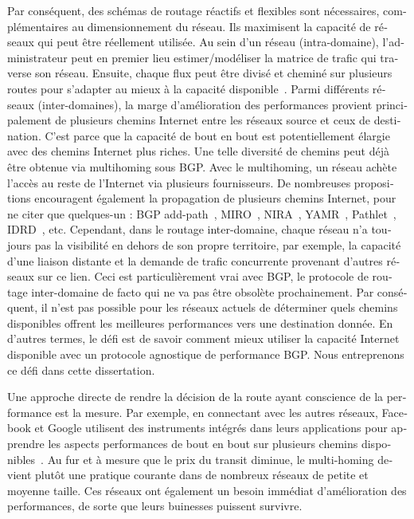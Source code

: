 \begin{otherlanguage}{french}
Par conséquent, des schémas de routage réactifs et flexibles sont nécessaires, complémentaires au dimensionnement du réseau.
Ils maximisent la capacité de réseaux qui peut être réellement utilisée.
Au sein d'un réseau (intra-domaine), l'administrateur peut en premier lieu estimer/modéliser la matrice de trafic qui traverse son réseau. 
Ensuite, chaque flux peut être divisé et cheminé sur plusieurs routes pour s'adapter au mieux à la capacité disponible~\cite{Xu2011, Jain2013}.
Parmi différents réseaux (inter-domaines), la marge d'amélioration des performances provient principalement de plusieurs chemins Internet 
entre les réseaux source et ceux de destination.
C'est parce que la capacité de bout en bout est potentiellement élargie avec des chemins Internet plus riches.
Une telle diversité de chemins peut déjà être obtenue via multihoming sous \acf{BGP}. 
Avec le multihoming, un réseau achète l'accès au reste de l'Internet via plusieurs fournisseurs.
De nombreuses propositions encouragent également la propagation de plusieurs chemins Internet, 
pour ne citer que quelques-un : BGP add-path~\cite{addpath}, MIRO~\cite{Xu2006}, NIRA~\cite{Yang2007}, YAMR~\cite{Ganichev2010}, Pathlet~\cite{Godfrey09}, IDRD~\cite{Misseri2013}, etc.
Cependant, dans le routage inter-domaine, chaque réseau n'a toujours pas la visibilité en dehors de son propre territoire, 
par exemple, la capacité d'une liaison distante et la demande de trafic concurrente  provenant d'autres réseaux sur ce lien.
Ceci est particulièrement vrai avec \ac{BGP}, le protocole de routage inter-domaine de facto qui ne va pas être obsolète prochainement.
Par conséquent, il n'est pas possible pour les réseaux actuels de déterminer quels chemins disponibles offrent les meilleures performances vers une destination donnée.
En d'autres termes, le défi est de savoir comment mieux utiliser la capacité Internet disponible avec un protocole agnostique de performance \ac{BGP}.
Nous entreprenons ce défi dans cette dissertation.

Une approche directe de rendre la décision de la route ayant conscience de la performance est la mesure. 
Par exemple, en connectant avec les autres réseaux, Facebook et Google utilisent des instruments intégrés dans leurs applications 
pour apprendre les aspects performances de bout en bout sur plusieurs chemins disponibles~\cite{Yap2017, Schlinker2017}.
Au fur et à mesure que le prix du transit diminue, le multi-homing devient plutôt une pratique courante dans de nombreux réseaux de petite et moyenne taille.
Ces réseaux ont également un besoin immédiat d'amélioration des performances, de sorte que leurs buinesses puissent survivre.


\end{otherlanguage}
